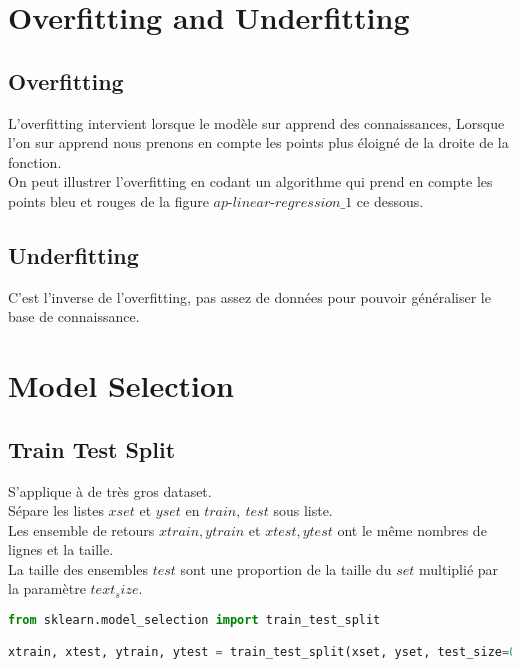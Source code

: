 \chapter{Overfitting and Underfitting}
\section{Overfitting}
L'overfitting intervient lorsque le modèle sur apprend des connaissances,
Lorsque l'on sur apprend nous prenons en compte les points plus éloigné de la droite de la fonction.\\
On peut illustrer l'overfitting en codant un algorithme qui prend en compte les points bleu et rouges de la figure $\textit{ap-linear-regression\_1}$ ce dessous.\\

\section{Underfitting}
C'est l'inverse de l'overfitting, pas assez de données pour pouvoir généraliser le base de connaissance.\\
\pagebreak

\chapter{Model Selection}
\pagebreak
\section{Train Test Split}
S'applique à de très gros dataset.\\
Sépare les listes $xset$ et $yset$ en $train,\ test$ sous liste.\\
Les ensemble de retours $xtrain,ytrain$ et $xtest,ytest$ ont le même nombres de lignes et la taille.\\
La taille des ensembles $test$ sont une proportion de la taille du $set$ multiplié par la paramètre $text_size$.\\

\lstset{style=mlpythoncode}
\begin{lstlisting}[language=Python]
from sklearn.model_selection import train_test_split

xtrain, xtest, ytrain, ytest = train_test_split(xset, yset, test_size=0.1, random_state=0)
\end{lstlisting}

